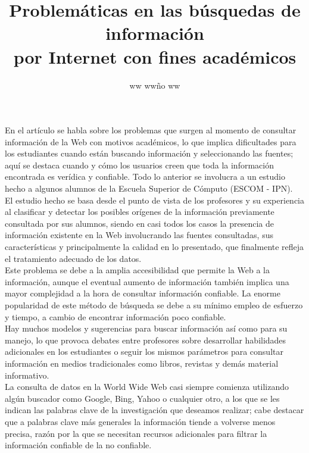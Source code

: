 \documentclass{article}
\title{Problemáticas en las búsquedas de información \\por Internet con fines académicos}
\author{ww ww\~no ww}
\date{} %
\begin{document}
	\maketitle
	\normalsize{
En el artículo se habla sobre los problemas que surgen al momento de consultar información de la Web con motivos académicos, lo que implica dificultades para los estudiantes cuando están buscando información y seleccionando las fuentes; aquí se destaca cuando y cómo los usuarios creen que toda la información encontrada es verídica y confiable. Todo lo anterior se involucra a un estudio hecho a algunos alumnos de la Escuela Superior de Cómputo (ESCOM - IPN).
\\

El estudio hecho se basa desde el punto de vista de los profesores y su experiencia al clasificar y detectar los posibles orígenes de la información previamente consultada por sus alumnos, siendo en casi todos los casos la presencia de información existente en la Web involucrando las fuentes consultadas, sus características y principalmente la calidad en lo presentado, que finalmente refleja el tratamiento adecuado de los datos.
\\

Este problema se debe a la amplia accesibilidad que permite la Web a la información, aunque el eventual aumento de información también implica una mayor complejidad a la hora de consultar información confiable. La enorme popularidad de este método de búsqueda se debe a su mínimo empleo de esfuerzo y tiempo, a cambio de encontrar información poco confiable.
\\

Hay muchos modelos y sugerencias para buscar información así como para su manejo, lo que provoca debates entre profesores sobre desarrollar habilidades adicionales en los estudiantes o seguir los mismos parámetros para consultar información en medios tradicionales como libros, revistas y demás material informativo.
\\

La consulta de datos en la World Wide Web casi siempre comienza utilizando algún buscador como Google, Bing, Yahoo o cualquier otro, a los que se les indican las palabras clave de la investigación que deseamos realizar; cabe destacar que a palabras clave más generales la información tiende a volverse menos precisa, razón por la que se necesitan recursos adicionales para filtrar la información confiable de la no confiable.
\\

}
\end{document}
